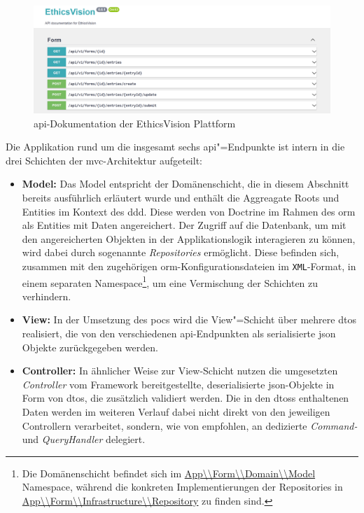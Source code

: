 \documentclass[a4paper,12pt,twoside]{scrreprt}
\begin{document}
\begin{figure}[ht]
    \centering
    \includegraphics[width=\linewidth]{thesis/images/Luidold_EthicsVision-API-Docs.png}
    \caption{\acs{api}-Dokumentation der EthicsVision Plattform}
    \label{fig:ethics-vision-api-docs}
\end{figure}

Die Applikation rund um die insgesamt sechs \ac{api}"=Endpunkte ist intern in die drei Schichten der \ac{mvc}-Architektur aufgeteilt:
\begin{itemize}
    \item \textbf{Model:} Das Model entspricht der Domänenschicht, die in diesem Abschnitt bereits ausführlich erläutert wurde und enthält die Aggreagate Roots und Entities im Kontext des \ac{ddd}. Diese werden von Doctrine im Rahmen des \ac{orm} als Entities mit Daten angereichert. Der Zugriff auf die Datenbank, um mit den angereicherten Objekten in der Applikationslogik interagieren zu können, wird dabei durch sogenannte \textit{Repositories} ermöglicht. Diese befinden sich, zusammen mit den zugehörigen \ac{orm}-Konfigurationsdateien im \texttt{XML}-Format, in einem separaten Namespace\footnote{Die Domänenschicht befindet sich im \url{App\\Form\\Domain\\Model} Namespace, während die konkreten Implementierungen der Repositories in \url{App\\Form\\Infrastructure\\Repository} zu finden sind.}, um eine Vermischung der Schichten zu verhindern.
    \item \textbf{View:} In der Umsetzung des \aclp{poc} wird die View"=Schicht über mehrere \acp{dto} realisiert, die von den verschiedenen \ac{api}-Endpunkten als serialisierte \ac{json} Objekte zurückgegeben werden.
    \item \textbf{Controller:} In ähnlicher Weise zur View-Schicht nutzen die umgesetzten \textit{Controller} vom Framework bereitgestellte, deserialisierte \ac{json}-Objekte in Form von \ac{dto}s, die zusätzlich validiert werden. Die in den \acp{dto}s enthaltenen Daten werden im weiteren Verlauf dabei nicht direkt von den jeweiligen Controllern verarbeitet, sondern, wie von \cite{symfony_sas_best-practices_2023} empfohlen, an dedizierte \textit{Command-} und \textit{QueryHandler} delegiert.
\end{itemize}
\end{document}
